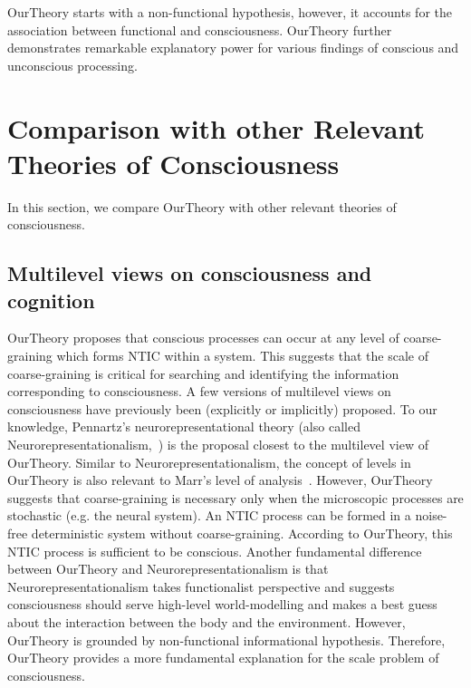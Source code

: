 \documentclass[utf8]{article}
\begin{document}
    	    \ac{OurTheory} starts with a non-functional hypothesis, however, it accounts for the association between  functional and consciousness. \ac{OurTheory} further demonstrates remarkable explanatory power for various findings of conscious and unconscious processing. 
	    
    \section{Comparison with other Relevant Theories of Consciousness}\label{sec:Comparison with other theories}
    In this section, we compare \ac{OurTheory} with other relevant theories of consciousness.
	
	
        \subsection{Multilevel views on consciousness and cognition}\label{sec:MultiLevelView}
    		\ac{OurTheory} proposes that conscious processes can occur at any level of coarse-graining which forms NTIC within a system. This suggests that the scale of coarse-graining is critical for searching and identifying the information corresponding to consciousness. A few versions of multilevel views on consciousness have previously been (explicitly or implicitly) proposed. To our knowledge, Pennartz's neurorepresentational theory (also called Neurorepresentationalism,~\citep{pennartz2018consciousness,pennartz2015brain}) is the proposal closest to the multilevel view of \ac{OurTheory}. Similar to Neurorepresentationalism, the concept of levels in \ac{OurTheory} is also relevant to Marr's level of analysis~\citep{marr1982vision, pennartz2015brain, pennartz2018consciousness}. 
    		However, \ac{OurTheory} suggests that coarse-graining is necessary only when the microscopic processes are stochastic (e.g. the neural system). An NTIC process can be formed in a noise-free deterministic system without coarse-graining. According to \ac{OurTheory}, this NTIC process is sufficient to be conscious. 
    		Another fundamental difference between \ac{OurTheory} and Neurorepresentationalism is that Neurorepresentationalism takes functionalist perspective and suggests consciousness should serve high-level world-modelling and makes a best guess about the interaction between the body and the environment. 
    		However, \ac{OurTheory} is grounded by non-functional informational hypothesis. Therefore, \ac{OurTheory} provides a more fundamental explanation for the scale problem of consciousness. 
    		
\end{document}
